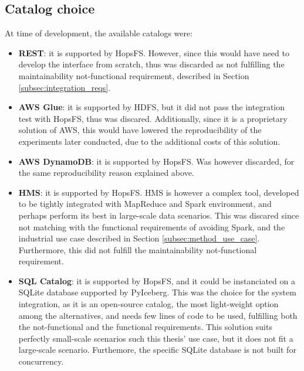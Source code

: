 \subsection{Catalog choice}
\label{subsec:integration_catalog_choice}
At time of development, the available catalogs were:
\begin{itemize}
    \item \textbf{REST}: it is supported by \gls{HopsFS}. However, since this would have need to develop the interface from scratch, thus was discarded as not fulfilling the maintainability not-functional requirement, described in Section \ref{subsec:integration_reqs}.
    \item \textbf{\gls{AWS} Glue}: it is supported by \gls{HDFS}, but it did not pass the integration test with \gls{HopsFS}, thus was discared. Additionally, since it is a proprietary solution of \gls{AWS}, this would have lowered the reproducibility of the experiments later conducted, due to the additional costs of this solution.
    \item \textbf{\gls{AWS} DynamoDB}: it is supported by \gls{HopsFS}. Was however discarded, for the same reproducibility reason explained above.
    \item \textbf{\gls{HMS}}: it is supported by \gls{HopsFS}. \gls{HMS} is however a complex tool, developed to be tightly integrated with MapReduce and Spark environment, and perhaps perform its best in large-scale data scenarios. This was discared since not matching with the functional requirements of avoiding Spark, and the industrial use case described in Section \ref{subsec:method_use_case}. Furthermore, this did not fulfill the maintainability not-functional requirement.
    \item \textbf{SQL Catalog}: it is supported by \gls{HopsFS}, and it could be instanciated on a SQLite database supported by PyIceberg. This was the choice for the system integration, as it is an open-source catalog, the most light-weight option among the alternatives, and needs few lines of code to be used, fulfilling both the not-functional and the functional requirements. This solution suits perfectly small-scale scenarios such this thesis' use case, but it does not fit a large-scale scenario. Furthemore, the specific SQLite database is not built for concurrency.
\end{itemize}


